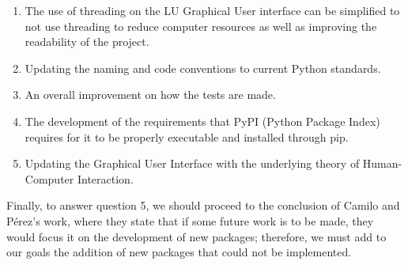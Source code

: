 \begin{enumerate}
    \item The use of threading on the LU Graphical User interface can be simplified to not use threading to reduce computer resources as well as improving the readability of the project.
    \item Updating the naming and code conventions to current Python standards.
    \item An overall improvement on how the tests are made.
    \item The development of the requirements that PyPI (Python Package Index) requires for it to be properly executable and installed through pip.
    \item Updating the Graphical User Interface with the underlying theory of Human-Computer Interaction.
\end{enumerate}

Finally, to answer question 5, we should proceed to the conclusion of Camilo and Pérez's work, where they state that if some future work is to be made, they would focus it on the development of new packages; therefore, we must add to our goals the addition of new packages that could not be implemented.


